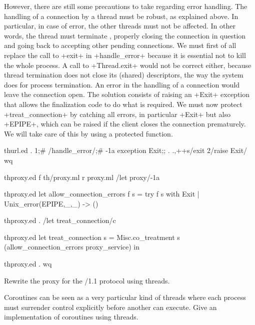 However, there are still some precautions to take regarding error
handling.  The handling of a connection by a thread must be robust, as
explained above. In particular, in case of error, the other threads
must not be affected. In other words, the thread must terminate
, properly closing the connection in question and
going back to accepting other pending connections.  We must first of
all replace the call to \ml+exit+ in \ml+handle_error+ because it is
essential not to kill the whole process.  A call to \ml+Thread.exit+
would not be correct either, because thread termination does not close
its (shared) descriptors, the way the system does for process
termination.  An error in the handling of a connection would leave the
connection open.  The solution consists of raising an \ml+Exit+
exception that allows the finalization code to do what is required.
We must now protect \ml+treat_connection+ by catching all errors, in
particular \ml+Exit+ but also \ml+EPIPE+, which can be raised if the
client closes the connection prematurely.  We will take care of this
by using a protected function.
%
\begin{codefile}{thurl.ed}
.
1;#
/handle_error/;#
-1a
exception Exit;;
.
.,++s/exit 2/raise Exit/
wq
\end{codefile}
%
\begin{codefile}{thproxy.ed}
f th/proxy.ml
r proxy.ml
/let proxy/-1a
\end{codefile}
\begin{listingcodefile}{thproxy.ed}
let allow_connection_errors f s = 
  try f s with Exit | Unix_error(EPIPE,_,_) -> ()
\end{listingcodefile}
%
\begin{codefile}{thproxy.ed}
.
/let treat_connection/c
\end{codefile}
%
\begin{listingcodefile}{thproxy.ed}
let treat_connection s = 
  Misc.co_treatment s (allow_connection_errors proxy_service) in
\end{listingcodefile}
%
\begin{codefile}{thproxy.ed}
.
wq
\end{codefile}

\begin{exercise}[noanswer]
Rewrite the proxy for the {\http}/1.1 protocol using threads.
\end{exercise}

\begin{exercise}[noanswer]
Coroutines can be seen as a very particular kind of threads where each
process must surrender control explicitly before another can execute.
Give an implementation of coroutines using threads.
\end{exercise}

